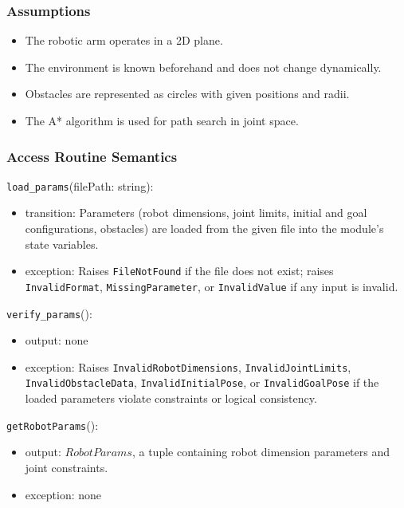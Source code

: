 \documentclass[12pt, titlepage]{article}
\begin{document}
\subsubsection{Assumptions}


\begin{itemize}
  \item The robotic arm operates in a 2D plane.
  \item The environment is known beforehand and does not change dynamically.
  \item Obstacles are represented as circles with given positions and radii.
  \item The A* algorithm is used for path search in joint space.
  \end{itemize}

  \subsubsection{Access Routine Semantics}

  \noindent \texttt{load\_params}(filePath: string):
  \begin{itemize}
  \item transition: Parameters (robot dimensions, joint limits, initial and goal configurations, obstacles) are loaded from the given file into the module's state variables.
  \item exception: Raises \texttt{FileNotFound} if the file does not exist; raises \texttt{InvalidFormat}, \texttt{MissingParameter}, or \texttt{InvalidValue} if any input is invalid.
  \end{itemize}
  
  \noindent \texttt{verify\_params}():
  \begin{itemize}
  \item output: none
  \item exception: Raises \texttt{InvalidRobotDimensions}, \texttt{InvalidJointLimits}, \texttt{InvalidObstacleData}, \texttt{InvalidInitialPose}, or \texttt{InvalidGoalPose} if the loaded parameters violate constraints or logical consistency.
  \end{itemize}
  
  \noindent \texttt{getRobotParams}():
  \begin{itemize}
  \item output: \( RobotParams \), a tuple containing robot dimension parameters and joint constraints.
  \item exception: none
  \end{itemize}
  
\end{document}
